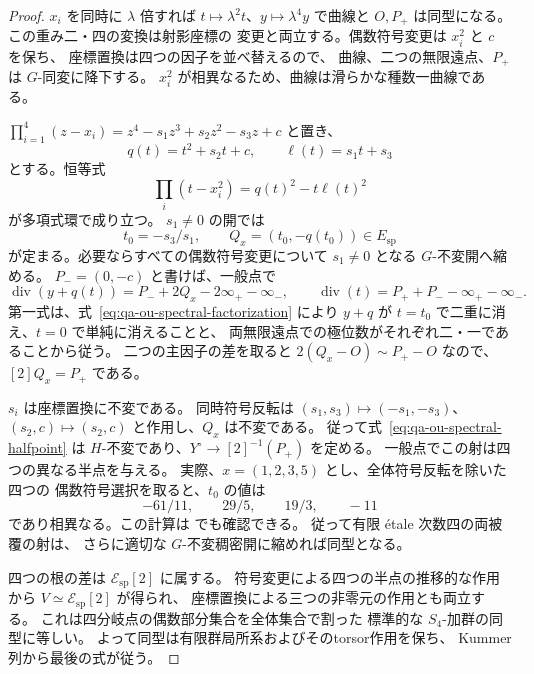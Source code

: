 \begin{proof}
$x_i$ を同時に $\lambda$ 倍すれば
$t\mapsto\lambda^2t$、$y\mapsto\lambda^4y$ で曲線と
$O,P_+$ は同型になる。この重み二・四の変換は射影座標の
変更と両立する。偶数符号変更は $x_i^2$ と $c$ を保ち、
座標置換は四つの因子を並べ替えるので、
曲線、二つの無限遠点、$P_+$ は $G$-同変に降下する。
$x_i^2$ が相異なるため、曲線は滑らかな種数一曲線である。

$\prod_{i=1}^4(z-x_i)=
 z^4-s_1z^3+s_2z^2-s_3z+c$ と置き、
\[
 q(t)=t^2+s_2t+c,\qquad \ell(t)=s_1t+s_3
\]
とする。恒等式
\[
 \prod_i(t-x_i^2)=q(t)^2-t\ell(t)^2
 \tag{OU-factor}\label{eq:qa-ou-spectral-factorization}
\]
が多項式環で成り立つ。
$s_1\ne0$ の開では
\[
 t_0=-s_3/s_1,\qquad
 Q_x=(t_0,-q(t_0))\in E_{\mathrm{sp}}
 \tag{OU-half-explicit}\label{eq:qa-ou-spectral-halfpoint}
\]
が定まる。必要ならすべての偶数符号変更について
$s_1\ne0$ となる $G$-不変開へ縮める。
$P_-=(0,-c)$ と書けば、一般点で
\[
 \operatorname{div}(y+q(t))
   =P_-+2Q_x-2\infty_+-\infty_-,
 \qquad
 \operatorname{div}(t)
   =P_++P_- -\infty_+-\infty_- .
\]
第一式は、式~\eqref{eq:qa-ou-spectral-factorization} により
$y+q$ が $t=t_0$ で二重に消え、$t=0$ で単純に消えることと、
両無限遠点での極位数がそれぞれ二・一であることから従う。
二つの主因子の差を取ると
$2(Q_x-O)\sim P_+-O$ なので、$[2]Q_x=P_+$ である。

$s_i$ は座標置換に不変である。
同時符号反転は $(s_1,s_3)\mapsto(-s_1,-s_3)$、
$(s_2,c)\mapsto(s_2,c)$ と作用し、$Q_x$ は不変である。
従って式~\eqref{eq:qa-ou-spectral-halfpoint} は
$H$-不変であり、$Y^\circ\to[2]^{-1}(P_+)$ を定める。
一般点でこの射は四つの異なる半点を与える。
実際、$x=(1,2,3,5)$ とし、全体符号反転を除いた四つの
偶数符号選択を取ると、$t_0$ の値は
\[
 -61/11,\qquad29/5,\qquad19/3,\qquad-11
\]
であり相異なる。この計算は
 でも確認できる。
従って有限 étale 次数四の両被覆の射は、
さらに適切な $G$-不変稠密開に縮めれば同型となる。

四つの根の差は $\mathcal E_{\mathrm{sp}}[2]$ に属する。
符号変更による四つの半点の推移的な作用から
$V\simeq\mathcal E_{\mathrm{sp}}[2]$ が得られ、
座標置換による三つの非零元の作用とも両立する。
これは四分岐点の偶数部分集合を全体集合で割った
標準的な $S_4$-加群の同型に等しい。
よって同型は有限群局所系およびそのtorsor作用を保ち、
Kummer列から最後の式が従う。
\end{proof}

